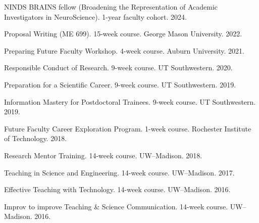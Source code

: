 \documentclass[letterpaper, 10pt]{article}
\begin{document}
\begin{compactenum}
     \item NINDS BRAINS fellow (Broadening the Representation of Academic Investigators in NeuroScience). 1-year faculty cohort. 2024.
	\item Proposal Writing (ME 699). 15-week course. George Mason University. 2022.
	\item Preparing Future Faculty Workshop. 4-week course. Auburn University. 2021.
	\item Responsible Conduct of Research. 9-week course. UT Southwestern. 2020.
	\item Preparation for a Scientific Career. 9-week course. UT Southwestern. 2019.
	\item Information Mastery for Postdoctoral Trainees. 9-week course. UT Southwestern. 2019.
	\item Future Faculty Career Exploration Program. 1-week course. Rochester Institute of Technology. 2018.
	\item Research Mentor Training. 14-week course. UW--Madison. 2018.
	\item Teaching in Science and Engineering. 14-week course. UW--Madison. 2017.
	\item Effective Teaching with Technology. 14-week course. UW--Madison. 2016.
	\item Improv to improve Teaching \& Science Communication. 14-week course. UW--Madison. 2016.
\end{compactenum}

%
%
\end{document}
